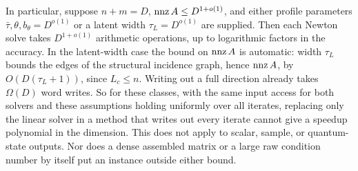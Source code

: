 In particular, suppose $n+m=D$, $\operatorname{nnz} A\leq D^{1+o(1)}$, and either
profile parameters $\bar\tau,\theta,b_\theta=D^{o(1)}$ or a latent width
$\tau_L=D^{o(1)}$ are supplied. Then each Newton solve takes
$D^{1+o(1)}$ arithmetic operations, up to logarithmic factors in the
accuracy. In the latent-width case the bound on $\operatorname{nnz} A$ is automatic:
width $\tau_L$ bounds the edges of the structural incidence graph, hence
$\operatorname{nnz} A$, by $O(D(\tau_L+1))$, since $L_c\leq n$. Writing out a full
direction already takes $\Omega(D)$ word writes. So for these classes,
with the same input access for both solvers and these assumptions
holding uniformly over all iterates, replacing only the linear solver in a method that
writes out every iterate cannot give a speedup polynomial in the
dimension. This does not apply to scalar, sample, or quantum-state
outputs. Nor does a dense assembled matrix or a large raw condition number
by itself put an instance outside either bound.
